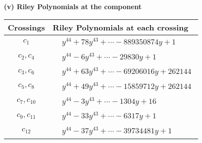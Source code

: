 \documentclass[1p]{elsarticle_modified}
\theoremstyle{definition}
\begin{document}
\flushleft \textbf{(v) Riley Polynomials at the component}\newline \\
\begin{tabular}{m{50pt}|m{274pt}}
Crossings & \hspace{64pt}Riley Polynomials at each crossing \\
\hline $$\begin{aligned}c_{1}\end{aligned}$$&$\begin{aligned}
&y^{44}+78 y^{43}+\cdots-889350874 y+1
\end{aligned}$\\
\hline $$\begin{aligned}c_{2},c_{4}\end{aligned}$$&$\begin{aligned}
&y^{44}-6 y^{43}+\cdots-29830 y+1
\end{aligned}$\\
\hline $$\begin{aligned}c_{3},c_{6}\end{aligned}$$&$\begin{aligned}
&y^{44}+63 y^{43}+\cdots-69206016 y+262144
\end{aligned}$\\
\hline $$\begin{aligned}c_{5},c_{8}\end{aligned}$$&$\begin{aligned}
&y^{44}+49 y^{43}+\cdots-15859712 y+262144
\end{aligned}$\\
\hline $$\begin{aligned}c_{7},c_{10}\end{aligned}$$&$\begin{aligned}
&y^{44}-3 y^{43}+\cdots-1304 y+16
\end{aligned}$\\
\hline $$\begin{aligned}c_{9},c_{11}\end{aligned}$$&$\begin{aligned}
&y^{44}-33 y^{43}+\cdots-6317 y+1
\end{aligned}$\\
\hline $$\begin{aligned}c_{12}\end{aligned}$$&$\begin{aligned}
&y^{44}-37 y^{43}+\cdots-39734481 y+1
\end{aligned}$\\
\hline
\end{tabular}\\~\\
\end{document}
